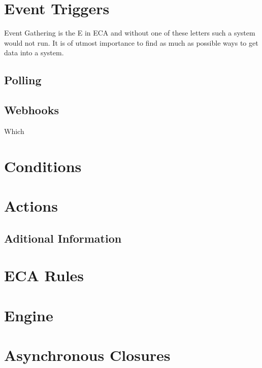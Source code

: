 \section{Event Triggers}

Event Gathering is the E in ECA and without one of these letters such a system would not run.
It is of utmost importance to find as much as possible ways to get data into a system.



\subsection{Polling}



\subsection{Webhooks}
Which 




\section{Conditions}




\section{Actions}

\subsection{Aditional Information}

\section{ECA Rules}





\section{Engine}






\section{Asynchronous Closures}
%

